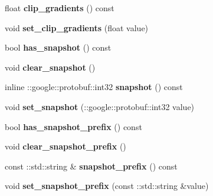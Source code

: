 \begin{DoxyCompactItemize}
\item 
\mbox{\label{classcaffe_1_1_solver_parameter_ad50b2dfd627b1952f06eb4389348b32d}} 
float {\bfseries clip\+\_\+gradients} () const
\item 
\mbox{\label{classcaffe_1_1_solver_parameter_ab4944f2b075d6768172b639887f5b32f}} 
void {\bfseries set\+\_\+clip\+\_\+gradients} (float value)
\item 
\mbox{\label{classcaffe_1_1_solver_parameter_ad5b499c6ef6878d1f7311a9406e4604c}} 
bool {\bfseries has\+\_\+snapshot} () const
\item 
\mbox{\label{classcaffe_1_1_solver_parameter_a56523ce7b8eda09b04152571931837f0}} 
void {\bfseries clear\+\_\+snapshot} ()
\item 
\mbox{\label{classcaffe_1_1_solver_parameter_a2cf6bcbcaeae6122598b6def8a0647f3}} 
inline \+::google\+::protobuf\+::int32 {\bfseries snapshot} () const
\item 
\mbox{\label{classcaffe_1_1_solver_parameter_a72a6d703192d5f1653705aa2e52ee8c6}} 
void {\bfseries set\+\_\+snapshot} (\+::google\+::protobuf\+::int32 value)
\item 
\mbox{\label{classcaffe_1_1_solver_parameter_a0b94dd3eb78840a73bc676d37faf19ef}} 
bool {\bfseries has\+\_\+snapshot\+\_\+prefix} () const
\item 
\mbox{\label{classcaffe_1_1_solver_parameter_a2f3727dcf47f4472343d982e7bbab3d9}} 
void {\bfseries clear\+\_\+snapshot\+\_\+prefix} ()
\item 
\mbox{\label{classcaffe_1_1_solver_parameter_a52051f55e46ad88c071a17d2b9e7d06b}} 
const \+::std\+::string \& {\bfseries snapshot\+\_\+prefix} () const
\item 
\mbox{\label{classcaffe_1_1_solver_parameter_a2c8ced4f5410f4b11427ce133dedad5b}} 
void {\bfseries set\+\_\+snapshot\+\_\+prefix} (const \+::std\+::string \&value)

\end{DoxyCompactItemize}
